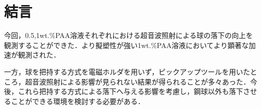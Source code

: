 \clearpage
\section{結言}

今回，0.5,1wt.\%PAA溶液それぞれにおける超音波照射による球の落下の向上を観測することができた．より擬塑性が強い1wt.\%PAA溶液においてより顕著な加速が観測された．

一方，球を把持する方式を電磁ホルダを用いず，ピックアップツールを用いたところ，超音波照射による影響が見られない結果が得られることが多々あった．今後，これら把持する方式による落下へ与える影響を考慮し，鋼球以外も落下させることができる環境を検討する必要がある．
